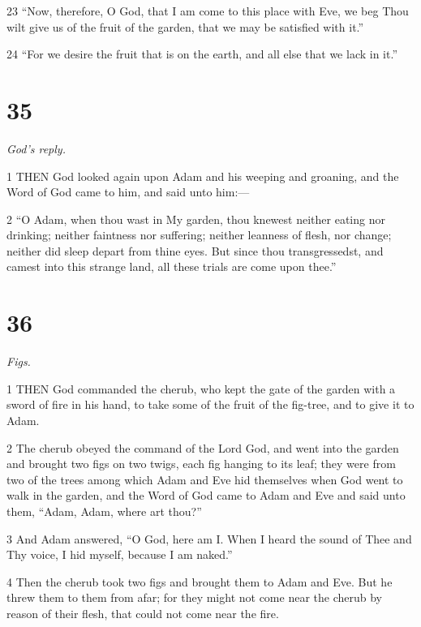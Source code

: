 \par 23 “Now, therefore, O God, that I am come to this place with Eve, we beg Thou wilt give us of the fruit of the garden, that we may be satisfied with it.”

\par 24 “For we desire the fruit that is on the earth, and all else that we lack in it.”

\chapter{35}

\par \textit{God's reply.}

\par 1 THEN God looked again upon Adam and his weeping and groaning, and the Word of God came to him, and said unto him:—

\par 2 “O Adam, when thou wast in My garden, thou knewest neither eating nor drinking; neither faintness nor suffering; neither leanness of flesh, nor change; neither did sleep depart from thine eyes. But since thou transgressedst, and camest into this strange land, all these trials are come upon thee.”

\chapter{36}

\par \textit{Figs.}

\par 1 THEN God commanded the cherub, who kept the gate of the garden with a sword of fire in his hand, to take some of the fruit of the fig-tree, and to give it to Adam.

\par 2 The cherub obeyed the command of the Lord God, and went into the garden and brought two figs on two twigs, each fig hanging to its leaf; they were from two of the trees among which Adam and Eve hid themselves when God went to walk in the garden, and the Word of God came to Adam and Eve and said unto them, “Adam, Adam, where art thou?”

\par 3 And Adam answered, “O God, here am I. When I heard the sound of Thee and Thy voice, I hid myself, because I am naked.”

\par 4 Then the cherub took two figs and brought them to Adam and Eve. But he threw them to them from afar; for they might not come near the cherub by reason of their flesh, that could not come near the fire.

